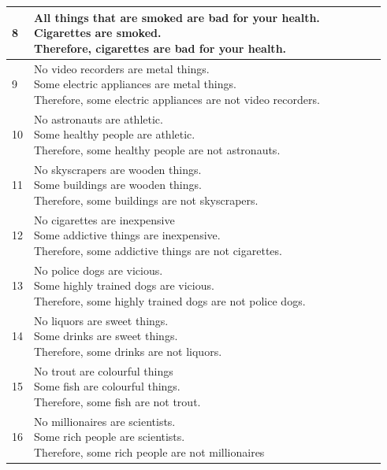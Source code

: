 \documentclass[10pt]{article}
\newcommand{\ptick}{\ding{51}}
\begin{document}
\begin{center}
\begin{tabular}{|l|l|c|c|c|c|c|}
			8 &\makecell[l]{All things that are smoked are bad for your health.\\Cigarettes are smoked.\\Therefore, cigarettes are bad for your health.} & \ptick & & \ptick& &\ptick\\ \hline
			9 &\makecell[l]{No video recorders are metal things.\\Some electric appliances are metal things.\\Therefore, some electric appliances are not video recorders.} & \ptick & & \ptick& & \ptick\\ \hline
			10 &\makecell[l]{No astronauts are athletic.\\Some healthy people are athletic.\\Therefore, some healthy people are not astronauts.} & \ptick & & \ptick& & \ptick \\ \hline
			11 &\makecell[l]{No skyscrapers are wooden things.\\Some buildings are wooden things.\\Therefore, some buildings are not skyscrapers.} & \ptick & & \ptick& & \ptick \\ \hline
			12 &\makecell[l]{No cigarettes are inexpensive\\Some addictive things are inexpensive.\\Therefore, some addictive things are not cigarettes.} & \ptick & & \ptick& & \ptick \\ \hline
			13 &\makecell[l]{No police dogs are vicious.\\Some highly trained dogs are vicious.\\Therefore, some highly trained dogs are not police dogs.} & \ptick & & \ptick& & \ptick \\ \hline
			14 &\makecell[l]{No liquors are sweet things.\\Some drinks are sweet things.\\Therefore, some drinks are not liquors.} & \ptick & & \ptick& & \ptick \\ \hline
			15 &\makecell[l]{No trout are colourful things\\Some fish are colourful things.\\Therefore, some fish are not trout.} & \ptick & & \ptick& & \ptick \\ \hline
			16 &\makecell[l]{No millionaires are scientists.\\Some rich people are scientists.\\Therefore, some rich people are not millionaires} & \ptick & & \ptick& & \ptick \\ \hline

\end{tabular}
\end{center}
\end{document}
